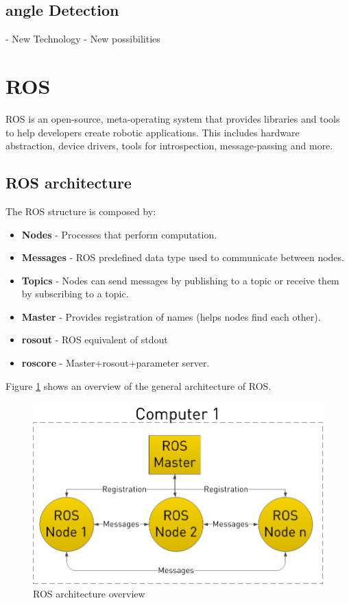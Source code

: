 \subsection{angle Detection}

- New Technology
- New possibilities
\section {ROS}
\ac{ROS} is an open-source, meta-operating system that provides libraries and tools to help developers create robotic applications. This includes hardware abstraction, device drivers, tools for introspection, message-passing and more.
\subsection{ROS architecture}
The ROS structure is composed by:
\begin{itemize}
\item \textbf{Nodes} - Processes that perform computation.
\item \textbf{Messages} - ROS predefined data type used to communicate between nodes. 
\item \textbf{Topics} - Nodes can send messages by publishing to a topic or receive them by subscribing to a topic. 
\item \textbf{Master} - Provides registration of names (helps nodes find each other).
\item \textbf{rosout} - ROS equivalent of stdout 
\item \textbf{roscore} - Master+rosout+parameter server. 
\end{itemize}


Figure \ref{fig:rosgraph} shows an overview of the general architecture of ROS.

\begin{figure}[h] 
\centerline{\includegraphics [width=0.5 \textwidth]{imgs/chapter2/rosgraph.png}}
\caption{ROS architecture overview \cite{rosbasics}}
\label{fig:rosgraph}
\end{figure}


